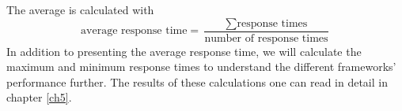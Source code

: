 The average is calculated with
\begin{equation*}
    \text{average response time} = \frac{\sum \text{response times}}{\text{number of response times}}
\end{equation*} 
In addition to presenting the average response time, we will calculate the maximum and minimum response times to understand the different frameworks' performance further. 
The results of these calculations one can read in detail in chapter \ref{ch5}.



 
